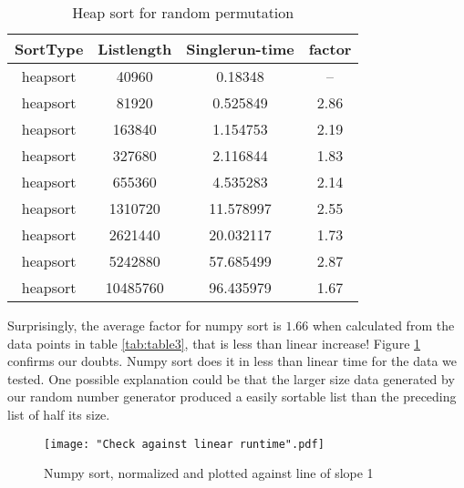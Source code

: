 \documentclass[sigconf, nonacm, natbib, screen, balance=False]{acmart}
\begin{document}
\begin{table}[ht]
\begin{center}
\begin{tabular}{|c|c|c|c|} 
\hline
\textbf{SortType} & 	\textbf{Listlength} & 	\textbf{Singlerun-time} & \textbf{factor} \\ 
\hline
heapsort &  40960 &  0.18348 &  --  \\ 
heapsort &  81920 &  0.525849 &  2.86 \\ 
heapsort &  163840 &  1.154753 &  2.19 \\ 
heapsort &  327680 &  2.116844 &  1.83 \\ 
heapsort &  655360 &  4.535283 &  2.14 \\ 
heapsort &  1310720 &  11.578997 &  2.55 \\ 
heapsort &  2621440 &  20.032117 &  1.73 \\ 
heapsort &  5242880 &  57.685499 &  2.87 \\ 
heapsort &  10485760 &  96.435979 &  1.67 \\ 
\hline
\end{tabular}
\end{center}
\caption{Heap sort for random permutation }
\label{tab:table2}
\end{table}

 Surprisingly, the average factor for numpy sort is $1.66$ when calculated from the data points in table \ref{tab:table3}, that is less than linear increase!  Figure \ref{fig:numpylinear} confirms our doubts. Numpy sort does it in less than linear time for the data we tested. One possible explanation could be that the larger size data generated by our random number generator produced a easily sortable list than the preceding list of half its size.

\begin{figure}[ht]
\texttt{[image: "Check against linear runtime".pdf]}
    \caption{Numpy sort, normalized and plotted against line of slope 1 }
    \label{fig:numpylinear}
\end{figure}
\end{document}
